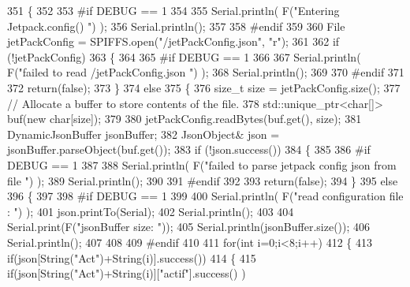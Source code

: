 \begin{DoxyCode}
351 \{
352 
353 \textcolor{preprocessor}{#if DEBUG == 1 }
354 
355     Serial.println( F(\textcolor{stringliteral}{"Entering Jetpack.config() "}) );
356     Serial.println();
357 
358 \textcolor{preprocessor}{#endif}
359 
360     File jetPackConfig = SPIFFS.open(\textcolor{stringliteral}{"/jetPackConfig.json"}, \textcolor{stringliteral}{"r"});
361 
362     \textcolor{keywordflow}{if} (!jetPackConfig) 
363     \{
364 
365 \textcolor{preprocessor}{    #if DEBUG == 1 }
366 
367         Serial.println( F(\textcolor{stringliteral}{"failed to read /jetPackConfig.json "}) );
368         Serial.println();
369 
370 \textcolor{preprocessor}{    #endif}
371 
372         \textcolor{keywordflow}{return}(\textcolor{keyword}{false});
373     \}
374     \textcolor{keywordflow}{else}
375     \{
376         \textcolor{keywordtype}{size\_t} size = jetPackConfig.size();
377         \textcolor{comment}{// Allocate a buffer to store contents of the file.}
378         std::unique\_ptr<char[]> buf(\textcolor{keyword}{new} \textcolor{keywordtype}{char}[size]);
379 
380         jetPackConfig.readBytes(buf.get(), size);
381         DynamicJsonBuffer jsonBuffer;
382         JsonObject& json = jsonBuffer.parseObject(buf.get());
383         \textcolor{keywordflow}{if} (!json.success()) 
384         \{
385         
386 \textcolor{preprocessor}{        #if DEBUG == 1 }
387 
388             Serial.println( F(\textcolor{stringliteral}{"failed to parse jetpack config json from file "}) );
389             Serial.println();
390 
391 \textcolor{preprocessor}{        #endif}
392 
393             \textcolor{keywordflow}{return}(\textcolor{keyword}{false});
394         \} 
395         \textcolor{keywordflow}{else}
396         \{ 
397         
398 \textcolor{preprocessor}{        #if DEBUG == 1 }
399 
400             Serial.println( F(\textcolor{stringliteral}{"read configuration file : "}) );
401             json.printTo(Serial);
402             Serial.println();
403 
404             Serial.print(F(\textcolor{stringliteral}{"jsonBuffer size: "}));
405             Serial.println(jsonBuffer.size());
406             Serial.println();
407 
408         
409 \textcolor{preprocessor}{        #endif}
410   
411             \textcolor{keywordflow}{for}(\textcolor{keywordtype}{int} i=0;i<8;i++)
412             \{   
413                 \textcolor{keywordflow}{if}(json[String(\textcolor{stringliteral}{"Act"})+String(i)].success())
414                 \{
415                     \textcolor{keywordflow}{if}(json[String(\textcolor{stringliteral}{"Act"})+String(i)][\textcolor{stringliteral}{"actif"}].success() )

\end{DoxyCode}
